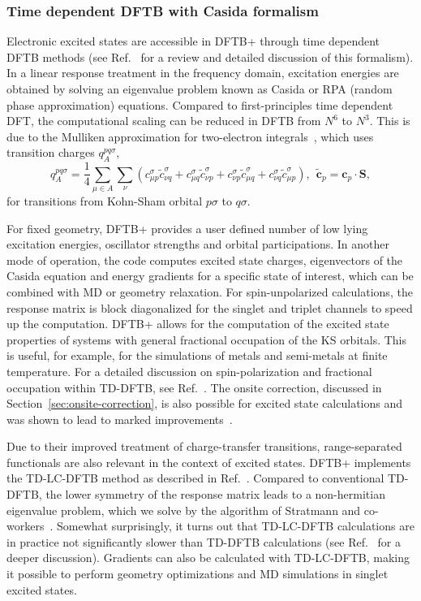 \documentclass[reprint,onecolumn,superscriptaddress]{revtex4-1}
\newcommand{\dftbp}{DFTB+}
\begin{document}
\subsubsection{Time dependent DFTB with Casida formalism}
\label{sec:TD-DFTB}

Electronic excited states are accessible in \dftbp{} through time dependent DFTB
methods (see Ref.~\cite{Niehaus2009} for a review and detailed
discussion of this formalism). In a linear response treatment in the
frequency domain, excitation energies are obtained by solving an eigenvalue
problem known as Casida or RPA (random phase approximation)
equations. Compared to first-principles time dependent DFT, the computational
scaling can be reduced in DFTB from $N^6$ to $N^3$. This is due to the Mulliken
approximation for two-electron integrals~\cite{Niehaus2001a}, which uses
transition charges $q^{pq\sigma}_A$,
\begin{equation}
  \label{qia}
  q_{A}^{pq\sigma} = \frac{1}{4} \sum_{\mu \in A}\sum_\nu  \left( c_{\mu
      p}^{\sigma} \tilde{c}_{\nu q}^{\sigma} +  c_{\mu q}^{\sigma}
    \tilde{c}_{\nu p}^{\sigma} + c_{\nu p}^{\sigma} \tilde{c}_{\mu
      q}^{\sigma} + c_{\nu q}^{\sigma} \tilde{c}_{\mu p}^{\sigma}
  \right), ~~ \tilde{\mathbf{c}}_p =  \mathbf{c}_p\cdot\mathbf{S},
\end{equation}
for transitions from Kohn-Sham orbital $p\sigma$ to $q\sigma$.

For fixed geometry, \dftbp{} provides a user defined number of low lying
excitation energies, oscillator strengths and orbital participations.  In
another mode of operation, the code computes excited state charges, eigenvectors
of the Casida equation and energy gradients for a specific state of interest,
which can be combined with MD or geometry relaxation. For spin-unpolarized
calculations, the response matrix is block diagonalized for the singlet and
triplet channels to speed up the computation.  \dftbp{} allows for the
computation of the excited state properties of systems with general fractional
occupation of the KS orbitals. This is useful, for example, for the simulations
of metals and semi-metals at finite temperature. For a detailed discussion on
spin-polarization and fractional occupation within TD-DFTB, see
Ref.~\cite{Dominguez2013}. The onsite correction, discussed in
Section~\ref{sec:onsite-correction}, is also possible for excited state
calculations and was shown to lead to marked improvements~\cite{Dominguez2013}.

Due to their improved treatment of charge-transfer transitions, range-separated
functionals are also relevant in the context of excited states. \dftbp{} implements
the TD-LC-DFTB method as described in Ref.~\cite{Kranz2017}. Compared to
conventional TD-DFTB, the lower symmetry of the response matrix leads to a
non-hermitian eigenvalue problem, which we solve by the algorithm
of Stratmann and co-workers~\cite{Stratmann1998}. Somewhat
surprisingly, it turns out that TD-LC-DFTB calculations are in practice not
significantly slower than TD-DFTB calculations (see Ref.~\cite{Kranz2017}
for a deeper discussion). Gradients can also be calculated with TD-LC-DFTB,
making it possible to perform geometry optimizations and MD simulations in
singlet excited states.
\end{document}
